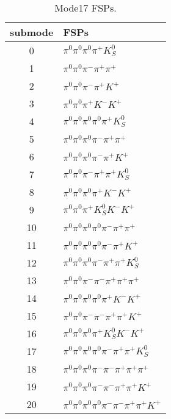 \begin{table}[h!]
\begin{center}
\begin{tabular}{cl}
\hline
submode& FSPs\\
\hline
0 & $\pi^0 \pi^0 \pi^0 \pi^+ K_S^0 $ \\
1 & $\pi^0 \pi^0 \pi^- \pi^+ \pi^+ $ \\
2 & $\pi^0 \pi^0 \pi^- \pi^+ K^+ $ \\
3 & $\pi^0 \pi^0 \pi^+ K^- K^+ $ \\
4 & $\pi^0 \pi^0 \pi^0 \pi^0 \pi^+ K_S^0 $ \\
5 & $\pi^0 \pi^0 \pi^0 \pi^- \pi^+ \pi^+ $ \\
6 & $\pi^0 \pi^0 \pi^0 \pi^- \pi^+ K^+ $ \\
7 & $\pi^0 \pi^0 \pi^- \pi^+ \pi^+ K_S^0 $ \\
8 & $\pi^0 \pi^0 \pi^0 \pi^+ K^- K^+ $ \\
9 & $\pi^0 \pi^0 \pi^+ K_S^0 K^- K^+ $ \\
10 & $\pi^0 \pi^0 \pi^0 \pi^0 \pi^- \pi^+ \pi^+ $ \\
11 & $\pi^0 \pi^0 \pi^0 \pi^0 \pi^- \pi^+ K^+ $ \\
12 & $\pi^0 \pi^0 \pi^0 \pi^- \pi^+ \pi^+ K_S^0 $ \\
13 & $\pi^0 \pi^0 \pi^- \pi^- \pi^+ \pi^+ \pi^+ $ \\
14 & $\pi^0 \pi^0 \pi^0 \pi^0 \pi^+ K^- K^+ $ \\
15 & $\pi^0 \pi^0 \pi^- \pi^- \pi^+ \pi^+ K^+ $ \\
16 & $\pi^0 \pi^0 \pi^0 \pi^+ K_S^0 K^- K^+ $ \\
17 & $\pi^0 \pi^0 \pi^0 \pi^0 \pi^- \pi^+ \pi^+ K_S^0 $ \\
18 & $\pi^0 \pi^0 \pi^0 \pi^- \pi^- \pi^+ \pi^+ \pi^+ $ \\
19 & $\pi^0 \pi^0 \pi^0 \pi^- \pi^- \pi^+ \pi^+ K^+ $ \\
20 & $\pi^0 \pi^0 \pi^0 \pi^0 \pi^- \pi^- \pi^+ \pi^+ K^+ $ \\
\hline
\end{tabular}
\label{tab:Mode17FSPs}
\caption{Mode17 FSPs.}
\end{center}
\end{table}
